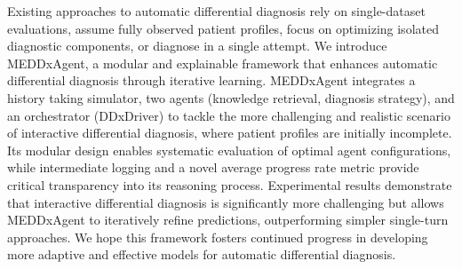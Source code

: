 \vspace{-0.5em}
Existing approaches to automatic differential diagnosis rely on single-dataset evaluations, assume fully observed patient profiles, focus on optimizing isolated diagnostic components, or diagnose in a single attempt. We introduce MEDDxAgent, a modular and explainable framework that enhances automatic differential diagnosis through iterative learning. MEDDxAgent integrates a history taking simulator, two agents (knowledge retrieval, diagnosis strategy), and an orchestrator (DDxDriver) to tackle the more challenging and realistic scenario of interactive differential diagnosis, where patient profiles are initially incomplete. Its modular design enables systematic evaluation of optimal agent configurations, while intermediate logging and a novel average progress rate metric provide critical transparency into its reasoning process. Experimental results demonstrate that interactive differential diagnosis is significantly more challenging but allows MEDDxAgent to iteratively refine predictions, outperforming simpler single-turn approaches. We hope this framework fosters continued progress in developing more adaptive and effective models for automatic differential diagnosis.